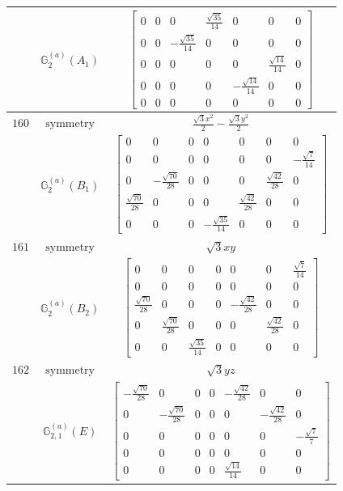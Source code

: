 \documentclass[fleqn,8pt,landscape]{jsarticle}
\begin{document}
\begin{longtable}{ccc}
$  $ & $ \mathbb{G}_{2}^{(a)}(A_{1}) $ & $ \begin{bmatrix} 0 & 0 & 0 & \frac{\sqrt{35}}{14} & 0 & 0 & 0 \\ 0 & 0 & - \frac{\sqrt{35}}{14} & 0 & 0 & 0 & 0 \\ 0 & 0 & 0 & 0 & 0 & \frac{\sqrt{14}}{14} & 0 \\ 0 & 0 & 0 & 0 & - \frac{\sqrt{14}}{14} & 0 & 0 \\ 0 & 0 & 0 & 0 & 0 & 0 & 0 \end{bmatrix} $ \\ \hline
$ 160 $ & $ \text{symmetry} $ & $ \frac{\sqrt{3} x^{2}}{2} - \frac{\sqrt{3} y^{2}}{2} $ \\
$  $ & $ \mathbb{G}_{2}^{(a)}(B_{1}) $ & $ \begin{bmatrix} 0 & 0 & 0 & 0 & 0 & 0 & 0 \\ 0 & 0 & 0 & 0 & 0 & 0 & - \frac{\sqrt{7}}{14} \\ 0 & - \frac{\sqrt{70}}{28} & 0 & 0 & 0 & \frac{\sqrt{42}}{28} & 0 \\ \frac{\sqrt{70}}{28} & 0 & 0 & 0 & \frac{\sqrt{42}}{28} & 0 & 0 \\ 0 & 0 & 0 & - \frac{\sqrt{35}}{14} & 0 & 0 & 0 \end{bmatrix} $ \\ \hline
$ 161 $ & $ \text{symmetry} $ & $ \sqrt{3} x y $ \\
$  $ & $ \mathbb{G}_{2}^{(a)}(B_{2}) $ & $ \begin{bmatrix} 0 & 0 & 0 & 0 & 0 & 0 & \frac{\sqrt{7}}{14} \\ 0 & 0 & 0 & 0 & 0 & 0 & 0 \\ \frac{\sqrt{70}}{28} & 0 & 0 & 0 & - \frac{\sqrt{42}}{28} & 0 & 0 \\ 0 & \frac{\sqrt{70}}{28} & 0 & 0 & 0 & \frac{\sqrt{42}}{28} & 0 \\ 0 & 0 & \frac{\sqrt{35}}{14} & 0 & 0 & 0 & 0 \end{bmatrix} $ \\ \hline
$ 162 $ & $ \text{symmetry} $ & $ \sqrt{3} y z $ \\
$  $ & $ \mathbb{G}_{2,1}^{(a)}(E) $ & $ \begin{bmatrix} - \frac{\sqrt{70}}{28} & 0 & 0 & 0 & - \frac{\sqrt{42}}{28} & 0 & 0 \\ 0 & - \frac{\sqrt{70}}{28} & 0 & 0 & 0 & - \frac{\sqrt{42}}{28} & 0 \\ 0 & 0 & 0 & 0 & 0 & 0 & - \frac{\sqrt{7}}{7} \\ 0 & 0 & 0 & 0 & 0 & 0 & 0 \\ 0 & 0 & 0 & 0 & \frac{\sqrt{14}}{14} & 0 & 0 \end{bmatrix} $ \\ \hline

\end{longtable}
\end{document}
